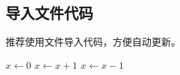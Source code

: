 \documentclass[12pt, a4paper, twoside]{article}
\begin{document}
\subsection{导入文件代码}

推荐使用文件导入代码，方便自动更新。




\begin{algorithm}
    \caption{Example Pseudocode}
    \begin{algorithmic}
        \STATE $x\gets0$
        \STATE $x\gets x+1$
        \ELSE
        \STATE $x\gets x-1$
        \ENDIF
    \end{algorithmic}
\end{algorithm}



\section*{} %

\end{document}
